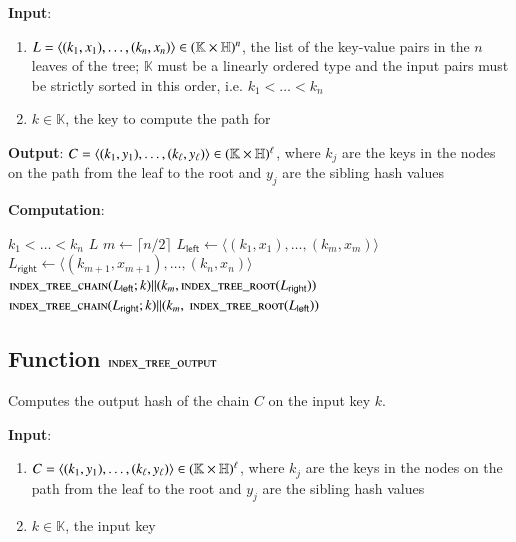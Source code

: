 \textbf{Input}:
\begin{enumerate}
	\item $L = \langle (k_1, x_1), \ldots, (k_n, x_n) \rangle \in (\mathbb{K} \times \mathbb{H})^n$, the list of the key-value pairs in the $n$ leaves of the tree; $\mathbb{K}$ must be a linearly ordered type and the input pairs must be strictly sorted in this order, i.e. $k_1 < \ldots < k_n$
	\item $k \in \mathbb{K}$, the key to compute the path for
\end{enumerate}

\textbf{Output}:
$C = \langle (k_1, y_1), \ldots, (k_\ell, y_\ell) \rangle \in (\mathbb{K} \times \mathbb{H})^\ell$, where $k_j$ are the keys in the nodes on the path from the leaf to the root and $y_j$ are the sibling hash values

\textbf{Computation}:
\begin{algorithmic}
		\State \Assert $k_1 < \ldots < k_n$
		 
			\State \Return $L$
		\Else
			\State $m \gets \lceil n/2 \rceil$ 
			\State $L_\mathsf{left} \gets \langle(k_1, x_1), \ldots, (k_m, x_m) \rangle$
			\State $L_\mathsf{right} \gets \langle (k_{m+1}, x_{m+1}), \ldots, (k_n, x_n) \rangle$
				\State \Return $\Call{index\_tree\_chain}{L_\mathsf{left}; k} \| (k_m, \Call{index\_tree\_root}{L_\mathsf{right}})$
			\Else
				\State \Return $\Call{index\_tree\_chain}{L_\mathsf{right}; k} \| (k_m, \Call{index\_tree\_root}{L_\mathsf{left}})$
			\EndIf
		\EndIf
	\EndFunction
\end{algorithmic}

\subsection{Function $\textsc{index\_tree\_output}$}\label{sec:index-tree-output}

Computes the output hash of the chain $C$ on the input key $k$.

\textbf{Input}:
\begin{enumerate}
	\item $C = \langle (k_1, y_1), \ldots, (k_\ell, y_\ell) \rangle \in (\mathbb{K} \times \mathbb{H})^\ell$, where $k_j$ are the keys in the nodes on the path from the leaf to the root and $y_j$ are the sibling hash values
	\item $k \in \mathbb{K}$, the input key
\end{enumerate}

